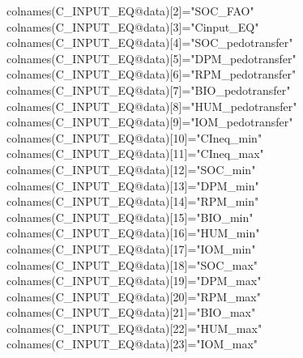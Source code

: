\documentclass[
  10pt,
  b5paper,
]{book}
\newenvironment{Shaded}{\begin{snugshade}}{\end{snugshade}}
\newcommand{\DecValTok}[1]{\textcolor[rgb]{0.00,0.00,0.81}{#1}}
\newcommand{\FunctionTok}[1]{\textcolor[rgb]{0.00,0.00,0.00}{#1}}
\newcommand{\NormalTok}[1]{#1}
\newcommand{\OtherTok}[1]{\textcolor[rgb]{0.56,0.35,0.01}{#1}}
\newcommand{\SpecialCharTok}[1]{\textcolor[rgb]{0.00,0.00,0.00}{#1}}
\newcommand{\StringTok}[1]{\textcolor[rgb]{0.31,0.60,0.02}{#1}}
\begin{document}
\begin{Shaded}
\begin{Highlighting}[]
\FunctionTok{colnames}\NormalTok{(C\_INPUT\_EQ}\SpecialCharTok{@}\NormalTok{data)[}\DecValTok{2}\NormalTok{]}\OtherTok{=}\StringTok{"SOC\_FAO"}
\FunctionTok{colnames}\NormalTok{(C\_INPUT\_EQ}\SpecialCharTok{@}\NormalTok{data)[}\DecValTok{3}\NormalTok{]}\OtherTok{=}\StringTok{"Cinput\_EQ"}
\FunctionTok{colnames}\NormalTok{(C\_INPUT\_EQ}\SpecialCharTok{@}\NormalTok{data)[}\DecValTok{4}\NormalTok{]}\OtherTok{=}\StringTok{"SOC\_pedotransfer"}
\FunctionTok{colnames}\NormalTok{(C\_INPUT\_EQ}\SpecialCharTok{@}\NormalTok{data)[}\DecValTok{5}\NormalTok{]}\OtherTok{=}\StringTok{"DPM\_pedotransfer"}
\FunctionTok{colnames}\NormalTok{(C\_INPUT\_EQ}\SpecialCharTok{@}\NormalTok{data)[}\DecValTok{6}\NormalTok{]}\OtherTok{=}\StringTok{"RPM\_pedotransfer"}
\FunctionTok{colnames}\NormalTok{(C\_INPUT\_EQ}\SpecialCharTok{@}\NormalTok{data)[}\DecValTok{7}\NormalTok{]}\OtherTok{=}\StringTok{"BIO\_pedotransfer"}
\FunctionTok{colnames}\NormalTok{(C\_INPUT\_EQ}\SpecialCharTok{@}\NormalTok{data)[}\DecValTok{8}\NormalTok{]}\OtherTok{=}\StringTok{"HUM\_pedotransfer"}
\FunctionTok{colnames}\NormalTok{(C\_INPUT\_EQ}\SpecialCharTok{@}\NormalTok{data)[}\DecValTok{9}\NormalTok{]}\OtherTok{=}\StringTok{"IOM\_pedotransfer"}
\FunctionTok{colnames}\NormalTok{(C\_INPUT\_EQ}\SpecialCharTok{@}\NormalTok{data)[}\DecValTok{10}\NormalTok{]}\OtherTok{=}\StringTok{"CIneq\_min"}
\FunctionTok{colnames}\NormalTok{(C\_INPUT\_EQ}\SpecialCharTok{@}\NormalTok{data)[}\DecValTok{11}\NormalTok{]}\OtherTok{=}\StringTok{"CIneq\_max"}
\FunctionTok{colnames}\NormalTok{(C\_INPUT\_EQ}\SpecialCharTok{@}\NormalTok{data)[}\DecValTok{12}\NormalTok{]}\OtherTok{=}\StringTok{"SOC\_min"}
\FunctionTok{colnames}\NormalTok{(C\_INPUT\_EQ}\SpecialCharTok{@}\NormalTok{data)[}\DecValTok{13}\NormalTok{]}\OtherTok{=}\StringTok{"DPM\_min"}
\FunctionTok{colnames}\NormalTok{(C\_INPUT\_EQ}\SpecialCharTok{@}\NormalTok{data)[}\DecValTok{14}\NormalTok{]}\OtherTok{=}\StringTok{"RPM\_min"}
\FunctionTok{colnames}\NormalTok{(C\_INPUT\_EQ}\SpecialCharTok{@}\NormalTok{data)[}\DecValTok{15}\NormalTok{]}\OtherTok{=}\StringTok{"BIO\_min"}
\FunctionTok{colnames}\NormalTok{(C\_INPUT\_EQ}\SpecialCharTok{@}\NormalTok{data)[}\DecValTok{16}\NormalTok{]}\OtherTok{=}\StringTok{"HUM\_min"}
\FunctionTok{colnames}\NormalTok{(C\_INPUT\_EQ}\SpecialCharTok{@}\NormalTok{data)[}\DecValTok{17}\NormalTok{]}\OtherTok{=}\StringTok{"IOM\_min"}
\FunctionTok{colnames}\NormalTok{(C\_INPUT\_EQ}\SpecialCharTok{@}\NormalTok{data)[}\DecValTok{18}\NormalTok{]}\OtherTok{=}\StringTok{"SOC\_max"}
\FunctionTok{colnames}\NormalTok{(C\_INPUT\_EQ}\SpecialCharTok{@}\NormalTok{data)[}\DecValTok{19}\NormalTok{]}\OtherTok{=}\StringTok{"DPM\_max"}
\FunctionTok{colnames}\NormalTok{(C\_INPUT\_EQ}\SpecialCharTok{@}\NormalTok{data)[}\DecValTok{20}\NormalTok{]}\OtherTok{=}\StringTok{"RPM\_max"}
\FunctionTok{colnames}\NormalTok{(C\_INPUT\_EQ}\SpecialCharTok{@}\NormalTok{data)[}\DecValTok{21}\NormalTok{]}\OtherTok{=}\StringTok{"BIO\_max"}
\FunctionTok{colnames}\NormalTok{(C\_INPUT\_EQ}\SpecialCharTok{@}\NormalTok{data)[}\DecValTok{22}\NormalTok{]}\OtherTok{=}\StringTok{"HUM\_max"}
\FunctionTok{colnames}\NormalTok{(C\_INPUT\_EQ}\SpecialCharTok{@}\NormalTok{data)[}\DecValTok{23}\NormalTok{]}\OtherTok{=}\StringTok{"IOM\_max"}


\end{Highlighting}
\end{Shaded}
\end{document}
